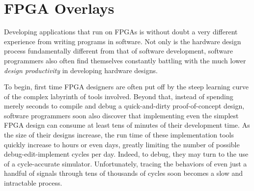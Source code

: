 \chapter{FPGA Overlays}
\vspace{3mm}
\label{Chap:Overlays}





\newcommand{\figref}[1]{Figure~\ref{#1}}
\newcommand{\eqnref}[1]{(\ref{#1})}

%
Developing applications that run on FPGAs is without doubt a very different experience from writing programs in software.
Not only is the hardware design process fundamentally different from that of software development, software programmers also often find themselves constantly battling with the much lower \emph{design productivity} in developing hardware designs.

To begin, first time FPGA designers are often put off by the steep learning curve of the complex labyrinth of tools involved.
Beyond that, instead of spending merely seconds to compile and debug a quick-and-dirty proof-of-concept design, software programmers soon also discover that implementing even the simplest FPGA design can consume at least tens of minutes of their development time.
As the size of their designs increase, the run time of these implementation tools quickly increase to hours or even days, greatly limiting the number of possible debug-edit-implement cycles per day.
Indeed, to debug, they may turn to the use of a cycle-accurate simulator. 
Unfortunately, tracing the behaviors of even just a handful of signals through tens of thousands of cycles soon becomes a slow and intractable process.

